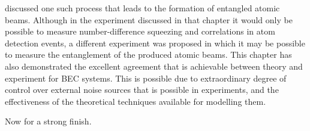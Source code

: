  discussed one such process that leads to the formation of entangled atomic beams.  Although in the experiment discussed in that chapter it would only be possible to measure number-difference squeezing and correlations in atom detection events, a different experiment was proposed in which it may be possible to measure the entanglement of the produced atomic beams.  This chapter has also demonstrated the excellent agreement that is achievable between theory and experiment for BEC systems.  This is possible due to extraordinary degree of control over external noise sources that is possible in experiments, and the effectiveness of the theoretical techniques available for modelling them.




Now for a strong finish.





